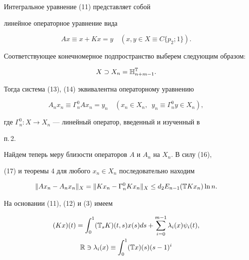 \begin{pf} 


Интегральное уравнение (11) представляет собой 


линейное операторное уравнение вида 


\begin{equation} 


A x\equiv x+K x=y\quad (x,y\in X\equiv C\{p_2;1\}). 


\end{equation} 


Соответствующее конечномерное подпространство выберем следующим образом: 


$$ 


X\supset X_n=\Bbb H^{\Bbb T}_{n+m-1}. 


$$ 


Тогда система (13), (14) эквивалентна операторному уравнению 


\begin{equation} 


A_n x_n\equiv\Gamma^0_n A x_n=y_n\quad 


(x_n\in X_n,\ \; y_n\equiv\Gamma^0_n y\in X_n), 


\end{equation} 


где $\Gamma^0_n:X\to X_n$ --- линейный оператор, введенный и изученный в 


п.\,2. 


 


Найдем теперь меру близости операторов $A$ и $A_n$ на $X_n$. В силу (16), 


(17) и теоремы 4 для любого $x_n\in X_n$ последовательно находим 


\begin{equation} 


\|A x_n-A_n x_n\|_X=\|K x_n-\Gamma^0_n K x_n\|_X\le d_2 


E_{n-1}(\Bbb T K x_n)\ln n. 


\end{equation} 


На основании (11), (12) и (3) имеем 


\begin{gather*} 


(K x)(t)=\int^1_0(\Bbb T_s K)(t,s)x(s)ds+ 


\sum^{m-1}_{i=0}\lambda_i(x)\psi_i(t), \\ 


% 


\Bbb R\ni \lambda_i(x)\equiv\int^1_0(\Bbb T x)(s)(s-1)^i 



\end{gather*}
\end{pf}
